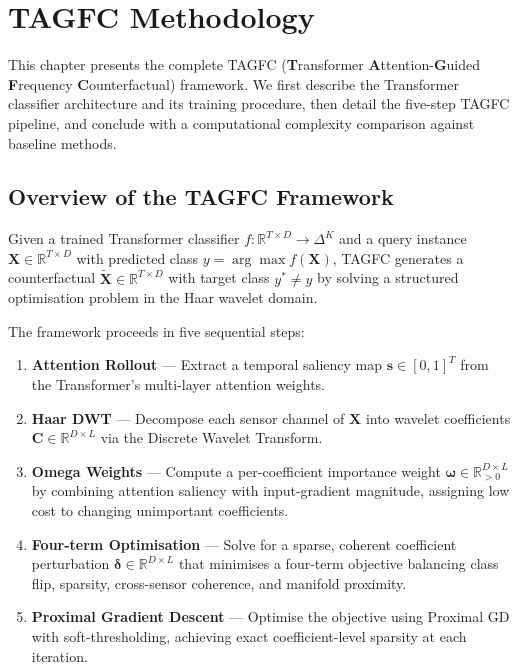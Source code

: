 \chapter{TAGFC Methodology}

This chapter presents the complete TAGFC (\textbf{T}ransformer \textbf{A}ttention-\textbf{G}uided \textbf{F}requency \textbf{C}ounterfactual) framework. We first describe the Transformer classifier architecture and its training procedure, then detail the five-step TAGFC pipeline, and conclude with a computational complexity comparison against baseline methods.

\section{Overview of the TAGFC Framework}

Given a trained Transformer classifier $f: \mathbb{R}^{T \times D} \rightarrow \Delta^K$ and a query instance $\mathbf{X} \in \mathbb{R}^{T \times D}$ with predicted class $y = \arg\max f(\mathbf{X})$, TAGFC generates a counterfactual $\widetilde{\mathbf{X}} \in \mathbb{R}^{T \times D}$ with target class $y^* \neq y$ by solving a structured optimisation problem in the Haar wavelet domain.

The framework proceeds in five sequential steps:

\begin{enumerate}
    \item \textbf{Attention Rollout} — Extract a temporal saliency map $\mathbf{s} \in [0,1]^T$ from the Transformer's multi-layer attention weights.
    \item \textbf{Haar DWT} — Decompose each sensor channel of $\mathbf{X}$ into wavelet coefficients $\mathbf{C} \in \mathbb{R}^{D \times L}$ via the Discrete Wavelet Transform.
    \item \textbf{Omega Weights} — Compute a per-coefficient importance weight $\boldsymbol{\omega} \in \mathbb{R}^{D \times L}_{>0}$ by combining attention saliency with input-gradient magnitude, assigning low cost to changing unimportant coefficients.
    \item \textbf{Four-term Optimisation} — Solve for a sparse, coherent coefficient perturbation $\boldsymbol{\delta} \in \mathbb{R}^{D \times L}$ that minimises a four-term objective balancing class flip, sparsity, cross-sensor coherence, and manifold proximity.
    \item \textbf{Proximal Gradient Descent} — Optimise the objective using Proximal GD with soft-thresholding, achieving exact coefficient-level sparsity at each iteration.
\end{enumerate}

